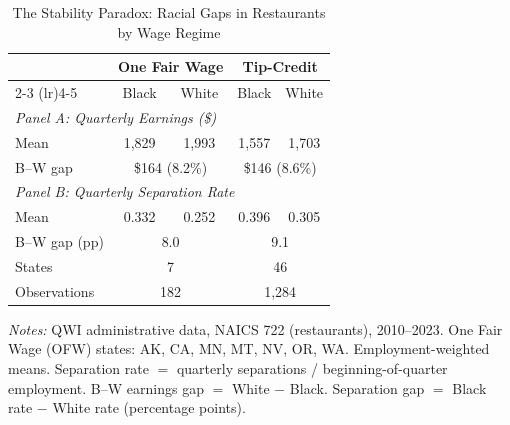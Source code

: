 
\begin{table}[t]
\centering
\caption{The Stability Paradox: Racial Gaps in Restaurants by Wage Regime}
\label{tab:paradox}
\begin{tabular}{lcccc}
\toprule
 & \multicolumn{2}{c}{One Fair Wage} & \multicolumn{2}{c}{Tip-Credit} \\
 \cmidrule(lr){2-3} \cmidrule(lr){4-5}
 & Black & White & Black & White \\
\midrule
\multicolumn{5}{l}{\textit{Panel A: Quarterly Earnings (\$)}} \\[3pt]
Mean & 1,829 & 1,993 & 1,557 & 1,703 \\
B--W gap & \multicolumn{2}{c}{\$164 (8.2\%)} & \multicolumn{2}{c}{\$146 (8.6\%)} \\[6pt]
\multicolumn{5}{l}{\textit{Panel B: Quarterly Separation Rate}} \\[3pt]
Mean & 0.332 & 0.252 & 0.396 & 0.305 \\
B--W gap (pp) & \multicolumn{2}{c}{8.0} & \multicolumn{2}{c}{9.1} \\[6pt]
\midrule
States & \multicolumn{2}{c}{7} & \multicolumn{2}{c}{46} \\
Observations & \multicolumn{2}{c}{182} & \multicolumn{2}{c}{1,284} \\
\bottomrule
\end{tabular}
\begin{tablenotes}
\small
\item \textit{Notes:} QWI administrative data, NAICS 722 (restaurants), 2010--2023. One Fair Wage (OFW) states: AK, CA, MN, MT, NV, OR, WA. Employment-weighted means. Separation rate $=$ quarterly separations / beginning-of-quarter employment. B--W earnings gap $=$ White $-$ Black. Separation gap $=$ Black rate $-$ White rate (percentage points).
\end{tablenotes}
\end{table}
